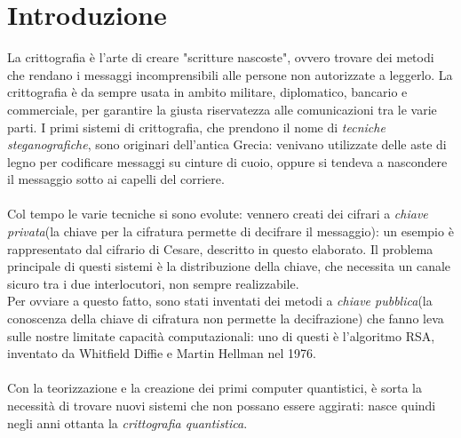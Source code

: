 \documentclass[italian,A4,12pt]{article}
\begin{document}
  \section{Introduzione}
  La crittografia è l'arte di creare "scritture nascoste", ovvero trovare dei metodi che rendano i messaggi incomprensibili alle persone non autorizzate a leggerlo. La crittografia è da sempre usata in ambito militare, diplomatico, bancario e commerciale, per garantire la giusta riservatezza alle comunicazioni tra le varie parti. I primi sistemi di crittografia, che prendono il nome di \textit{tecniche steganografiche}, sono originari dell'antica Grecia: venivano utilizzate delle aste di legno per codificare messaggi su cinture di cuoio, oppure si tendeva a nascondere il messaggio sotto ai capelli del corriere.\\\\
  Col tempo le varie tecniche si sono evolute: vennero creati dei cifrari a \textit{chiave privata}(la chiave per la cifratura permette di decifrare il messaggio): un esempio è rappresentato dal cifrario di Cesare, descritto in questo elaborato.
  Il problema principale di questi sistemi è la distribuzione della chiave, che necessita un canale sicuro tra i due interlocutori, non sempre realizzabile.\\
  Per ovviare a questo fatto, sono stati inventati dei metodi a \textit{chiave pubblica}(la conoscenza della chiave di cifratura non permette la decifrazione) che fanno leva sulle nostre limitate capacità computazionali: uno di questi è l'algoritmo RSA, inventato da Whitfield Diffie e Martin Hellman nel 1976.\\\\
  Con la teorizzazione e la creazione dei primi computer quantistici, è sorta la necessità di trovare nuovi sistemi che non possano essere aggirati: nasce quindi negli anni ottanta la \textit{crittografia quantistica}.
\end{document}

